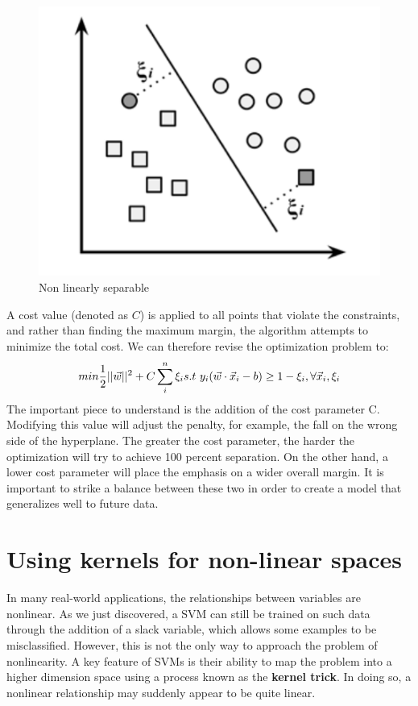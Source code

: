 \documentclass[
]{article}
\begin{document}
\begin{figure}

{\centering \includegraphics[width=0.5\linewidth,]{images/nonlinearlyspearable} 

}

\caption{Non linearly separable}\label{fig:fig5}
\end{figure}

A cost value (denoted as \(C\)) is applied to all points that violate
the constraints, and rather than finding the maximum margin, the
algorithm attempts to minimize the total cost. We can therefore revise
the optimization problem to:
\[min\frac{1}{2}||\vec w||^2 +C\sum_i^n\xi_i \\ s.t \ y_i(\vec w \cdot \vec x_i-b ) \geq 1-\xi_i,\forall\vec x_i,\xi_i \]
The important piece to understand is the addition of the cost parameter
C. Modifying this value will adjust the penalty, for example, the fall
on the wrong side of the hyperplane. The greater the cost parameter, the
harder the optimization will try to achieve 100 percent separation. On
the other hand, a lower cost parameter will place the emphasis on a
wider overall margin. It is important to strike a balance between these
two in order to create a model that generalizes well to future data.

\hypertarget{using-kernels-for-non-linear-spaces}{%
\section{Using kernels for non-linear
spaces}\label{using-kernels-for-non-linear-spaces}}

In many real-world applications, the relationships between variables are
nonlinear. As we just discovered, a SVM can still be trained on such
data through the addition of a slack variable, which allows some
examples to be misclassified. However, this is not the only way to
approach the problem of nonlinearity. A key feature of SVMs is their
ability to map the problem into a higher dimension space using a process
known as the \textbf{kernel trick}. In doing so, a nonlinear
relationship may suddenly appear to be quite linear.
\end{document}
